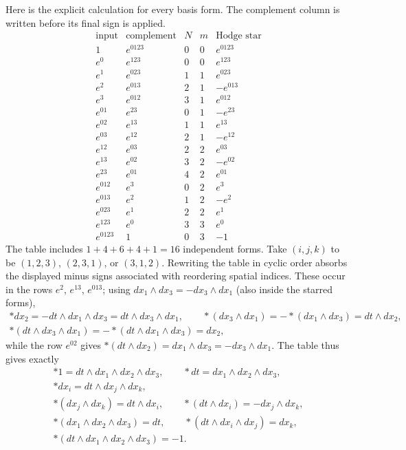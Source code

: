 Here is the explicit calculation for every basis form. The complement
column is written before its final sign is applied.
\[
\begin{array}{c|c|r|r|c}
\text{input}&\text{complement}&N&m&\text{Hodge star}\\ \hline
1&e^{0123}&0&0&e^{0123}\\
e^0&e^{123}&0&0&e^{123}\\
e^1&e^{023}&1&1&e^{023}\\
e^2&e^{013}&2&1&-e^{013}\\
e^3&e^{012}&3&1&e^{012}\\ \hline
e^{01}&e^{23}&0&1&-e^{23}\\
e^{02}&e^{13}&1&1&e^{13}\\
e^{03}&e^{12}&2&1&-e^{12}\\
e^{12}&e^{03}&2&2&e^{03}\\
e^{13}&e^{02}&3&2&-e^{02}\\
e^{23}&e^{01}&4&2&e^{01}\\ \hline
e^{012}&e^3&0&2&e^3\\
e^{013}&e^2&1&2&-e^2\\
e^{023}&e^1&2&2&e^1\\
e^{123}&e^0&3&3&e^0\\
e^{0123}&1&0&3&-1
\end{array}
\]
The table includes $1+4+6+4+1=16$ independent forms. Take $(i,j,k)$
to be $(1,2,3)$, $(2,3,1)$, or $(3,1,2)$. Rewriting the table in cyclic order
absorbs the displayed minus signs associated with reordering spatial
indices. These occur in the rows $e^2$, $e^{13}$, $e^{013}$; using
$dx_1\wedge dx_3=-dx_3\wedge dx_1$ (also inside the starred forms),
\begin{gather*}
*dx_2=-dt\wedge dx_1\wedge dx_3=dt\wedge dx_3\wedge dx_1,\qquad
*(dx_3\wedge dx_1)=-{*}(dx_1\wedge dx_3)=dt\wedge dx_2,\\
*(dt\wedge dx_3\wedge dx_1)=-{*}(dt\wedge dx_1\wedge dx_3)=dx_2,
\end{gather*}
while the row $e^{02}$ gives
$*(dt\wedge dx_2)=dx_1\wedge dx_3=-dx_3\wedge dx_1$.
The table thus gives exactly
\begin{gather*}
*1=dt\wedge dx_1\wedge dx_2\wedge dx_3,\qquad
*dt=dx_1\wedge dx_2\wedge dx_3,\\
*dx_i=dt\wedge dx_j\wedge dx_k,\\
*(dx_j\wedge dx_k)=dt\wedge dx_i,\qquad
*(dt\wedge dx_i)=-dx_j\wedge dx_k,\\
*(dx_1\wedge dx_2\wedge dx_3)=dt,\qquad
*(dt\wedge dx_i\wedge dx_j)=dx_k,\\
*(dt\wedge dx_1\wedge dx_2\wedge dx_3)=-1.
\end{gather*}
